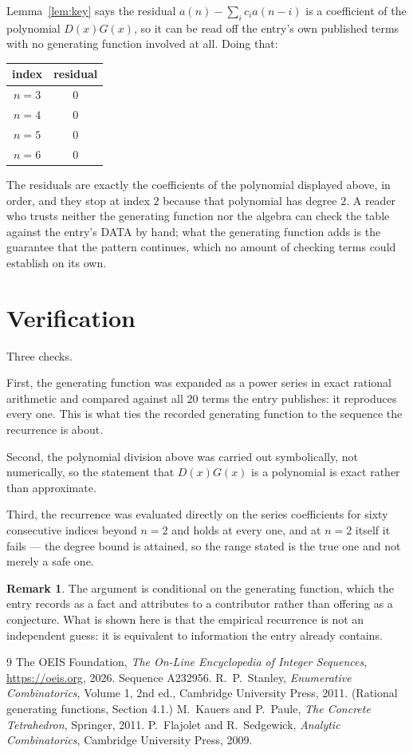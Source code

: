 \documentclass[11pt,a4paper]{article}
\theoremstyle{plain}
\theoremstyle{definition}
\newtheorem{remark}[theorem]{Remark}
\begin{document}
Lemma~\ref{lem:key} says the residual $a(n)-\sum_ic_ia(n-i)$ is a coefficient of the
polynomial $D(x)G(x)$, so it can be read off the entry's own published terms with no
generating function involved at all. Doing that:
\begin{center}
\begin{tabular}{cc}
index & residual \\ \hline
$n=3$ & $0$ \\
$n=4$ & $0$ \\
$n=5$ & $0$ \\
$n=6$ & $0$
\end{tabular}
\end{center}
The residuals are exactly the coefficients of the polynomial displayed above, in order, and
they stop at index $2$ because that polynomial has degree $2$. A reader who trusts
neither the generating function nor the algebra can check the table against the entry's DATA
by hand; what the generating function adds is the guarantee that the pattern continues, which
no amount of checking terms could establish on its own.

\section{Verification}

Three checks.

First, the generating function was expanded as a power series in exact rational arithmetic and
compared against all $20$ terms the entry publishes: it reproduces every one. This is
what ties the recorded generating function to the sequence the recurrence is about.

Second, the polynomial division above was carried out symbolically, not numerically, so the
statement that $D(x)G(x)$ is a polynomial is exact rather than approximate.

Third, the recurrence was evaluated directly on the series coefficients for sixty consecutive
indices beyond $n=2$ and holds at every one, and at $n=2$ itself it fails --- the
degree bound is attained, so the range stated is the true one and not merely a safe one.

\begin{remark}
The argument is conditional on the generating function, which the entry records as a fact and
attributes to a contributor rather than offering as a conjecture. What is shown here is that
the empirical recurrence is not an independent guess: it is equivalent to information the
entry already contains.
\end{remark}

\begin{thebibliography}{9}
 The OEIS Foundation, \emph{The On-Line Encyclopedia of Integer
Sequences}, \url{https://oeis.org}, 2026. Sequence A232956.
 R.~P.~Stanley, \emph{Enumerative Combinatorics}, Volume 1, 2nd ed.,
Cambridge University Press, 2011. (Rational generating functions, Section 4.1.)
 M.~Kauers and P.~Paule, \emph{The Concrete Tetrahedron}, Springer, 2011.
 P.~Flajolet and R.~Sedgewick, \emph{Analytic Combinatorics}, Cambridge
University Press, 2009.
\end{thebibliography}
\end{document}
